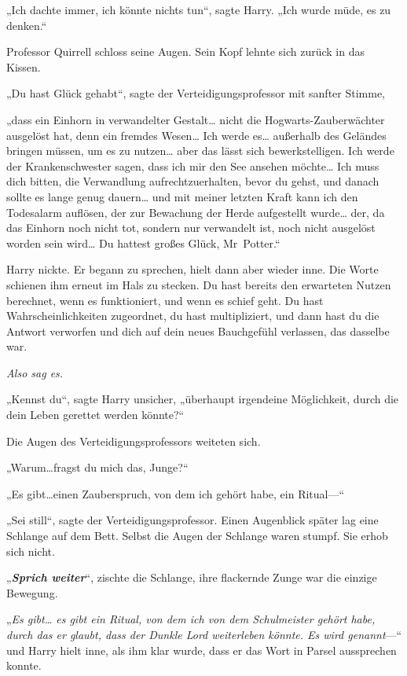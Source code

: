 {„Ich dachte immer, ich könnte nichts tun“, sagte Harry. „Ich wurde müde, es zu denken.“

Professor Quirrell schloss seine Augen. Sein Kopf lehnte sich zurück in das Kissen.

„Du hast Glück gehabt“, sagte der Verteidigungsprofessor mit sanfter Stimme,

„dass ein Einhorn in verwandelter Gestalt… nicht die Hogwarts-Zauberwächter ausgelöst hat, denn ein fremdes Wesen… Ich werde es… außerhalb des Geländes bringen müssen, um es zu nutzen… aber das lässt sich bewerkstelligen. Ich werde der Krankenschwester sagen, dass ich mir den See ansehen möchte… Ich muss dich bitten, die Verwandlung aufrechtzuerhalten, bevor du gehst, und danach sollte es lange genug dauern… und mit meiner letzten Kraft kann ich den Todesalarm auflösen, der zur Bewachung der Herde aufgestellt wurde… der, da das Einhorn noch nicht tot, sondern nur verwandelt ist, noch nicht ausgelöst worden sein wird… Du hattest großes Glück, Mr~Potter.“

Harry nickte. Er begann zu sprechen, hielt dann aber wieder inne. Die Worte schienen ihm erneut im Hals zu stecken. Du hast bereits den erwarteten Nutzen berechnet, wenn es funktioniert, und wenn es schief geht. Du hast Wahrscheinlichkeiten zugeordnet, du hast multipliziert, und dann hast du die Antwort verworfen und dich auf dein neues Bauchgefühl verlassen, das dasselbe war.

\emph{Also sag es.}

„Kennst du“, sagte Harry unsicher, „überhaupt irgendeine Möglichkeit, durch die dein Leben gerettet werden könnte?“

Die Augen des Verteidigungsprofessors weiteten sich.

„Warum…fragst du mich das, Junge?“

„Es gibt…einen Zauberspruch, von dem ich gehört habe, ein Ritual—“

„Sei still“, sagte der Verteidigungsprofessor. Einen Augenblick später lag eine Schlange auf dem Bett. Selbst die Augen der Schlange waren stumpf. Sie erhob sich nicht.

„\textbf{\emph{Sprich weiter}}“, zischte die Schlange, ihre flackernde Zunge war die einzige Bewegung.

„\emph{Es gibt… es gibt ein Ritual, von dem ich von dem Schulmeister gehört habe, durch das er glaubt, dass der Dunkle Lord weiterleben könnte. Es wird genannt}—“ und Harry hielt inne, als ihm klar wurde, dass er das Wort in Parsel aussprechen konnte.

}
